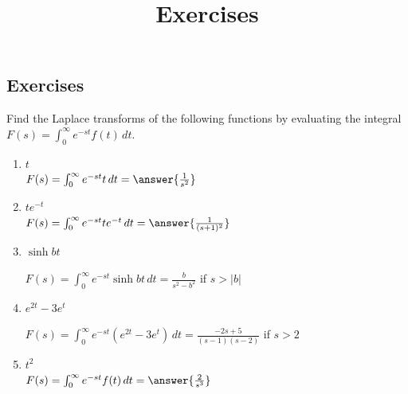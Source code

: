 \documentclass{ximera}
\title{Exercises} \license{CC BY-NC-SA 4.0}
\begin{document}
\begin{abstract}
\end{abstract}
\maketitle

\begin{onlineOnly}
\section*{Exercises}
\end{onlineOnly}


\begin{problem}\label{exer:8.1.1}
Find the Laplace transforms of the following functions by evaluating
the integral $F(s)=\int_0^\infty e^{-st} f(t)\,dt$.

\begin{enumerate}
    \item $t$ \\
    $F(s)=\int_0^\infty e^{-st} t\,dt = \answer{\frac{1}{s^2}}$
    
    \item $te^{-t}$ \\
    $F(s)=\int_0^\infty e^{-st} te^{-t}\,dt = \answer{\frac{1}{(s+1)^2}}$
    
    \item $\sinh bt$ \\
\begin{solution}
    $F(s)=\int_0^\infty e^{-st} \sinh bt\,dt = \frac{b}{s^2 -b^2}$ if $s>|b|$ 
\end{solution}
    
    \item $e^{2t}-3e^t$ \\
\begin{solution}
    $F(s)=\int_0^\infty e^{-st} (e^{2t}-3e^t)\,dt=\frac{-2s+5}{(s-1)(s-2)}$ if $s>2$
\end{solution}
    
    \item $t^2$ \\
    $F(s)=\int_0^\infty e^{-st} f(t)\,dt = \answer{\frac{2}{s^3}}$

    
\end{enumerate}
\end{problem}
\end{document}
